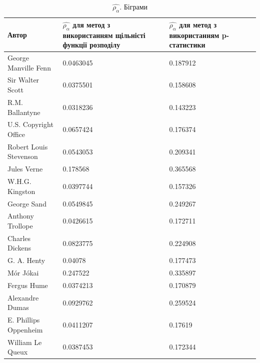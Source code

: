 \documentclass[12pt, a4paper]{extarticle}
\begin{document}
\begin{center}
\begin{table}
\begin{tabular}{|p{11em}|p{10em}|p{10em}|}
\hline
Автор & $\hat{\rho_\alpha}$ для метод з використанням щільністі функції розподілу & $\hat{\rho_\alpha}$ для метод з використанням p-статистики\\
\hline
George Manville Fenn & 0.0463045 & 0.187912\\
Sir Walter Scott & 0.0375501 & 0.158608 \\
R.M. Ballantyne & 0.0318236 & 0.143223\\
U.S. Copyright Office & 0.0657424 & 0.176374\\
Robert Louis Stevenson & 0.0543053 & 0.209341\\
Jules Verne & 0.178568 & 0.365568\\
W.H.G. Kingston & 0.0397744 & 0.157326\\
George Sand & 0.0549845 & 0.249267\\
Anthony Trollope & 0.0426615 & 0.172711\\
Charles Dickens & 0.0823775 & 0.224908\\
G. A. Henty & 0.04078 & 0.177473\\
Mór Jókai & 0.247522 & 0.335897\\
Fergus Hume & 0.0374213 & 0.170879\\
Alexandre Dumas & 0.0929762 & 0.259524\\
E. Phillips Oppenheim & 0.0411207 & 0.17619\\
William Le Queux & 0.0387453 & 0.172344\\
\hline
\end{tabular}
\caption{$\hat{\rho_\alpha}$. Біграми}
\label{tab:7}
\end{table}
\end{center}
\end{document}
